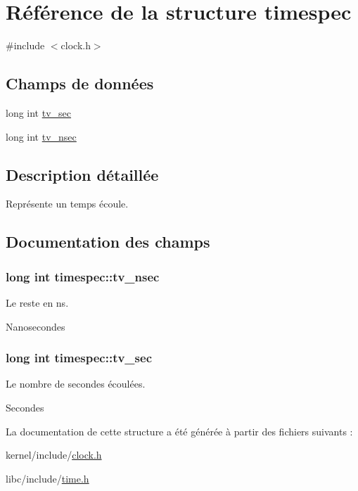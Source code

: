 \hypertarget{structtimespec}{\section{Référence de la structure timespec}
\label{structtimespec}
}


{\ttfamily \#include $<$clock.\-h$>$}

\subsection*{Champs de données}
\begin{DoxyCompactItemize}
\item 
long int \hyperlink{structtimespec_af632894a12c37dea87073c0126f99fff}{tv\-\_\-sec}
\item 
long int \hyperlink{structtimespec_aa9689622a344d847333e534ac23d3093}{tv\-\_\-nsec}
\end{DoxyCompactItemize}


\subsection{Description détaillée}
Représente un temps écoule. 

\subsection{Documentation des champs}
\hypertarget{structtimespec_aa9689622a344d847333e534ac23d3093}{
\subsubsection[{tv\-\_\-nsec}]{\setlength{\rightskip}{0pt plus 5cm}long int timespec\-::tv\-\_\-nsec}}\label{structtimespec_aa9689622a344d847333e534ac23d3093}
Le reste en ns.

Nanosecondes \hypertarget{structtimespec_af632894a12c37dea87073c0126f99fff}{
\subsubsection[{tv\-\_\-sec}]{\setlength{\rightskip}{0pt plus 5cm}long int timespec\-::tv\-\_\-sec}}\label{structtimespec_af632894a12c37dea87073c0126f99fff}
Le nombre de secondes écoulées.

Secondes 

La documentation de cette structure a été générée à partir des fichiers suivants \-:\begin{DoxyCompactItemize}
\item 
kernel/include/\hyperlink{clock_8h}{clock.\-h}\item 
libc/include/\hyperlink{time_8h}{time.\-h}\end{DoxyCompactItemize}

